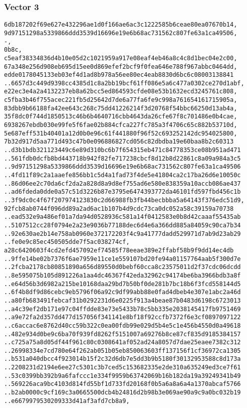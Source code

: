 \documentclass[
]{article}
\begin{document}
\hypertarget{vector-3-2}{%
\subsubsection{Vector 3}\label{vector-3-2}}

\begin{verbatim}
6db187202f69e627e432296ae1d0f166ae6ac3c1222585b6ceae80ea07670b14,
9d97151298a5339866ddd3539d16696e19e6b68ac731562c807fe63a1ca49506,
-,
0b8c,
c5eaf38334836d4b10e05d2c1021959a917e08eaf4eb46a8c4c8d1bec04e2c00,
67a348e256d908eb695d15ee0d869efef2bcf9f0fea646e788f967abbc0464dd,
edde0178045133eb03ef4d1ad8b978a56ee80ec4eab8830d6bc6c08003138841
..6657d3c449d9398cc4385d1c8a2bb19bcf61ff086e5a6c477a0302ce270d1abf,
e22ec3e4a2a4132237eb8a62bcc5ed864593cfde08e53b1632ecd3245761c808,
c5fba3b46f755acec221fb5d25642d7de6a77fa6fe9c998a761654161715905a,
83dbb9b66188fa42ee643c268c75dd41226214f3d20768f54bbc66250d13ab4a,
35f8dc0f744d1850513c46b6b4640716cbb4643da26cfe67f8c701486e0b4cae,
6938267ebdb030e99fe5f6fae02b884cfca227fc785a3f4706c65c882b53710d,
5e687eff531b40401a12d0b0e96c61f441880f96f52c693252142dc954025800,
7b32d917d5aa771d493c47b0e096886827cd056c82dbdba19e60baa8b2c60313
..d3b1bdb321123449c6e89d310bc6b7f654315eb471c84778353ce08b951ad471
..561fdb0dcfb8bd443718b942f82fe717238cbcf8d12b8d22861c8a09a984a3c5
..9d97151298a5339866ddd3539d16696e19e6b68ac731562c807fe63a1ca49506
..4fd11f89c2a1aaefe856bb1c5d4a1fad73f4de5e41804ca2c17ba26d6e10050c
..86d06ee2c70da6cf2da2a828d8a9d8ef755ad6e580e838359a10accb086ae437
..ad6fdeda0dde0a57c51d3226b87e3795e6474393772da46101fd597fbd456c1b
..3f9dc0c4f67f207974123830c2d66988fb3fb44becbbba5a64143f376edc51d9,
92fcb8ab0744f096dd89a2ad6ac1b107b4d9cdc73ca0dc052a58c39159a70738
..ead532e9a486ef01a7da94d0528936c581a14f0412583e0b8d42caaaf55435ab
..5107512cc28f0794e2a23e9036b77188dec6d4e6a366dd885a84059c90ca7b34
..92e630ae2b14e758ab0960e372172203f4c9a41777dadd529971d7ab9d23ab29
..fe0e9c85ec450505dde7f5ac038274cf,
a28c6420603f4cd2efd457092ef74585f78eeae389e2ffabf58b9f9dd14ec4db
..9ffe14be02b7376f6ae7959e11ce1e559107bd20fe94a01157764aab5f300d7e
..2fcba2178cb80851890a656d89550d0bebf60cca8c23575011d2f37cdc06dcdd
..8e595075b105d891226a1aa4dc46367f42eda32962c94174be6ba3966bdb3a8f
..e64d56b3d6982a215be10168daa29bd7b50bf0de281b7bc18b6f3fcd558144d5
..6f4b8df9d86cebc9eb5796f06a92c9df99abb88e0fad4dbeb4e307e1abc2a46d
..a80fb683491febcaf31b0292231d6e0225f913a4beae87b0483d6198c6723013
..a4c39ef2db171e97c04ffdde83e73e5433b78c5bb335e2038145417fb9751469
..a9e72fa2d357dd477d157056f341141e8bf18f92ccfb7372f6e3cf0897097122
..c6accac6e8762d40cc59b322c0ea00fdb99e029d5b4e5c1e456b4550d0a49618
..482e934d0be9c6ba70f939fd8262f5151007a69276b8ce87cf835d9185384157
..c725a75a8d05df44f961c80c0308641af052ad24a8057d7dae25eaee7382c312
..26998334e7cd780e64f262ab051b05eb850063603ff137156f1cf36972ca1305
..b531a040dbcc4f923014b15f2c32d6db7e5dd3b9b5180f30132953588c8d173a
..2208231d2194e6ee27c5301c3b7ced5c153682335e2de310a635249ed3ce7f61
..53c0399bb392b9a6fafccc1e334f9959b63742069b16b182da19a39249341b49
..569226aca9bc4103d814fd55bf1d733fd20168f0b5a6a8a6a4a1370abcaf5766
..b2ab0000c9cf169c3a0665500dcb4b24816d2b98b3e069ae90a9c9a0bc032b19
..e6679979530209333d41af3afd7cb8a9,
\end{verbatim}
\end{document}
